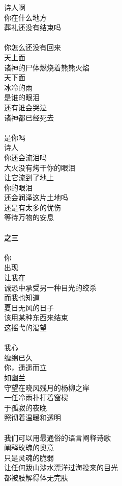 诗人啊\\
你在什么地方\\
葬礼还没有结束吗\\
\\
你怎么还没有回来\\
天上面\\
诸神的尸体燃烧着熊熊火焰\\
天下面\\
冰冷的雨\\
是谁的眼泪\\
还有谁会哭泣\\
诸神都已经死去\\
\\
是你吗\\
诗人\\
你还会流泪吗\\
大火没有烤干你的眼泪\\
让它流到了地上\\
你的眼泪\\
还会润泽这片土地吗\\
还是有太多的忧伤\\
等待万物的安息\\
\\
\textbf{之三}\\
\\
你\\
出现\\
让我在\\
诚恐中承受另一种目光的绞杀\\
而我也知道\\
夏日无风的日子\\
该用某种东西来结束\\
这摇弋的渴望\\
\\
我心\\
缠绵已久\\
你，遥遥而立\\
如幽兰\\
守望在晓风残月的杨柳之岸\\
一任冷雨扑打着窗棂\\
于孤寂的夜晚\\
照彻着温暖和透明\\
\\
我们可以用最通俗的语言阐释诗歌\\
阐释玫瑰的奥意\\
只是灵魂的脆弱\\
让任何跋山涉水漂洋过海投来的目光\\
都被肢解得体无完肤\\
